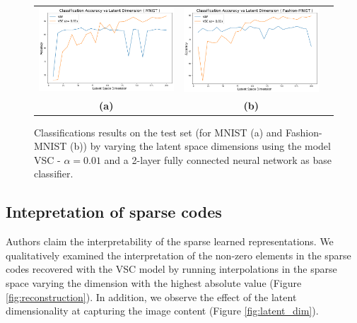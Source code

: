 \begin{figure}[h]
    \centering
    \captionsetup{justification=centering,margin=1.3cm}
    \begin{tabular}{ccc}
    \includegraphics[width=.45\textwidth]{figures/mnist_class} &
    \includegraphics[width=.45\textwidth]{figures/mnist_fashion_class} \\
    \textbf{(a)}  & \textbf{(b)}   \\[6pt]
\end{tabular}
    \centering
    \caption{Classifications results on the test set (for MNIST (a) and Fashion-MNIST (b)) by varying the latent space dimensions using the model VSC - $\alpha = 0.01$ and a 2-layer fully connected neural network as base classifier. }
    \label{fig:classification}
\end{figure}

\subsection{Intepretation of sparse codes}
Authors claim the interpretability of the sparse learned representations. We qualitatively examined the interpretation of the non-zero elements in the sparse codes recovered with the VSC model by running interpolations in the sparse space varying the dimension with the highest absolute value (Figure \ref{fig:reconstruction}). In addition, we observe the effect of the latent dimensionality at capturing the image content (Figure \ref{fig:latent_dim}).

